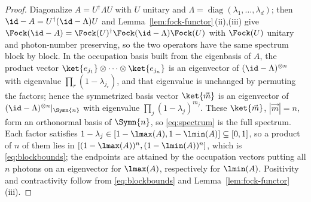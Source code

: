 \begin{proof}
Diagonalize $A=U^\dagger\Lambda U$ with $U$ unitary and
$\Lambda=\operatorname{diag}(\lambda_1,\dots,\lambda_d)$; then
$\id-A=U^\dagger(\id-\Lambda)U$ and Lemma~\ref{lem:fock-functor}\,(ii),(iii) give
$\Fock(\id-A)=\Fock(U)^\dagger\Fock(\id-\Lambda)\Fock(U)$ with $\Fock(U)$
unitary and photon-number preserving, so the two operators have the same
spectrum block by block. In the occupation basis built from the eigenbasis of
$A$, the product vector $\ket{e_{j_1}}\otimes\cdots\otimes\ket{e_{j_n}}$ is an
eigenvector of $(\id-\Lambda)^{\otimes n}$ with eigenvalue
$\prod_r(1-\lambda_{j_r})$, and that eigenvalue is unchanged by permuting the
factors; hence the symmetrized basis vector $\ket{\vec m}$ is an eigenvector of
$(\id-\Lambda)^{\otimes n}|_{\Symn{n}}$ with eigenvalue
$\prod_j(1-\lambda_j)^{m_j}$. These $\ket{\vec m}$, $|\vec m|=n$, form an
orthonormal basis of $\Symn{n}$, so \eqref{eq:spectrum} is the full spectrum.
Each factor satisfies $1-\lambda_j\in[1-\lmax(A),1-\lmin(A)]\subseteq[0,1]$,
so a product of $n$ of them lies in
$[(1-\lmax(A))^n,(1-\lmin(A))^n]$, which is \eqref{eq:blockbounds}; the
endpoints are attained by the occupation vectors putting all $n$ photons on an
eigenvector for $\lmax(A)$, respectively for $\lmin(A)$. Positivity and
contractivity follow from \eqref{eq:blockbounds} and
Lemma~\ref{lem:fock-functor}\,(iii).
\end{proof}

